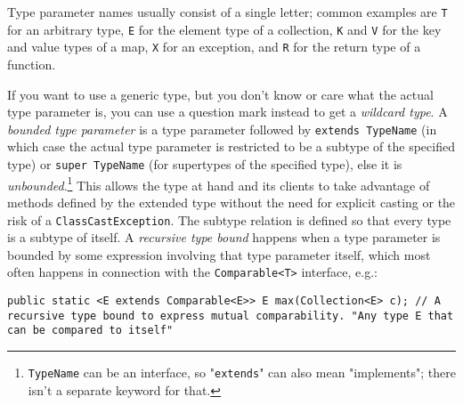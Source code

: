 \documentclass[8pt, table, xcdraw]{article}%
\begin{document}
Type parameter names usually consist of a single letter; common examples are \lstinline{T} for an arbitrary type, \lstinline{E} for the element type of a collection, \lstinline{K} and \lstinline{V} for the key and value types of a map, \lstinline{X} for an exception, and \lstinline{R} for the return type of a function.

If you want to use a generic type, but you don't know or care what the actual type parameter is, you can use a question mark instead to get a \emph{wildcard type}. A \emph{bounded type parameter} is a type parameter followed by \lstinline{extends TypeName} (in which case the actual type parameter is restricted to be a subtype of the specified type) or \lstinline{super TypeName} (for supertypes of the specified type), else it is \emph{unbounded}.\footnote{\lstinline{TypeName} can be an interface, so "\lstinline{extends}" can also mean "implements"; there isn't a separate keyword for that.} This allows the type at hand and its clients to take advantage of methods defined by the extended type without the need for explicit casting or the risk of a \lstinline{ClassCastException}. The subtype relation is defined so that every type is a subtype of itself. A \emph{recursive type bound} happens when a type parameter is bounded by some expression involving that type parameter itself, which most often happens in connection with the \lstinline{Comparable<T>} interface, e.g.:

\begin{lstlisting}
public static <E extends Comparable<E>> E max(Collection<E> c); // A recursive type bound to express mutual comparability. "Any type E that can be compared to itself"
\end{lstlisting}
\end{document}

